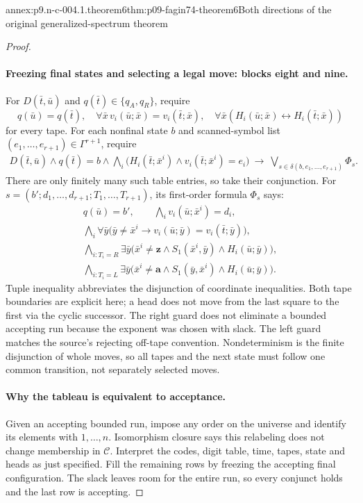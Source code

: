 \begin{annexitem}{annex:p9.n-c-004.1.theorem6}{thm:p09-fagin74-theorem6}{Both directions of the original generalized-spectrum theorem}
\begin{proof}
\paragraph{Freezing final states and selecting a legal move: blocks eight and nine.}
For \(D(\bar t,\bar u)\) and \(q(\bar t)\in\{q_A,q_R\}\), require
\[
 q(\bar u)=q(\bar t),\quad
 \forall\bar x\,v_i(\bar u;\bar x)=v_i(\bar t;\bar x),\quad
 \forall\bar x(H_i(\bar u;\bar x)\longleftrightarrow
                              H_i(\bar t;\bar x))
\]
for every tape.  For each nonfinal state \(b\) and scanned-symbol list
\((e_1,\ldots,e_{r+1})\in\Gamma^{r+1}\), require
\[
 \begin{split}
 D(\bar t,\bar u)\land q(\bar t)=b\land
 \bigwedge_i\bigl(H_i(\bar t;\bar x^i)\land
                    v_i(\bar t;\bar x^i)=e_i\bigr)
 \ \to\ \bigvee_{s\in\delta(b,e_1,\ldots,e_{r+1})}\Phi_s.
 \end{split}
\]
There are only finitely many such table entries, so take their conjunction.
For \(s=(b';d_1,\ldots,d_{r+1};T_1,\ldots,T_{r+1})\), its
first-order formula \(\Phi_s\) says:
\[
 \begin{gathered}
 q(\bar u)=b',\qquad
 \bigwedge_i v_i(\bar u;\bar x^i)=d_i,\\
 \bigwedge_i\forall\bar y\bigl(\bar y\ne\bar x^i\to
              v_i(\bar u;\bar y)=v_i(\bar t;\bar y)\bigr),\\
 \bigwedge_{i:T_i=R}\exists\bar y
     \bigl(\bar x^i\ne\mathbf z\land S_1(\bar x^i,\bar y)
                                     \land H_i(\bar u;\bar y)\bigr),\\
 \bigwedge_{i:T_i=L}\exists\bar y
     \bigl(\bar x^i\ne\mathbf a\land S_1(\bar y,\bar x^i)
                                     \land H_i(\bar u;\bar y)\bigr).
 \end{gathered}
\]
Tuple inequality abbreviates the disjunction of coordinate inequalities.
Both tape boundaries are explicit here; a head does not move from the last
square to the first via the cyclic successor.  The right guard does not
eliminate a bounded accepting run because the exponent was chosen with slack.
The left guard matches the source's rejecting off-tape convention.
Nondeterminism is the finite disjunction of whole moves, so all tapes and the
next state must follow one common transition, not separately selected moves.

\paragraph{Why the tableau is equivalent to acceptance.}
Given an accepting bounded run, impose any order on the universe and identify
its elements with \(1,\ldots,n\).  Isomorphism closure says this relabeling
does not change membership in \(\mathcal C\).  Interpret the codes, digit
table, time, tapes, state and heads as just specified.  Fill the remaining
rows by freezing the accepting final configuration.  The slack leaves room
for the entire run, so every conjunct holds and the last row is accepting.


\end{proof}
\end{annexitem}
